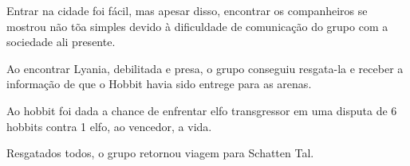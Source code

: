 Entrar na cidade foi f\'acil, mas apesar disso, encontrar os companheiros
se mostrou n\~ao t\~oa simples devido \`a dificuldade de comunica\c{c}\~ao
do grupo com a sociedade ali presente.

Ao encontrar Lyania, debilitada e presa,
o grupo conseguiu resgata-la e receber a informa\c{c}\~ao de que o
Hobbit havia sido entrege para as arenas.

Ao hobbit foi dada a chance de enfrentar elfo transgressor
em uma disputa de 6 hobbits contra 1 elfo, ao vencedor, a vida.

Resgatados todos, o grupo retornou viagem para
Schatten Tal.

